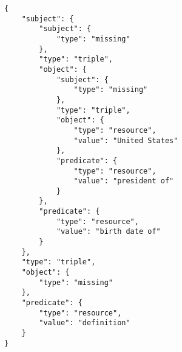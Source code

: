 \begin{verbatim}
{
    "subject": {
        "subject": {
            "type": "missing"
        },
        "type": "triple",
        "object": {
            "subject": {
                "type": "missing"
            },
            "type": "triple",
            "object": {
                "type": "resource",
                "value": "United States"
            },
            "predicate": {
                "type": "resource",
                "value": "president of"
            }
        },
        "predicate": {
            "type": "resource",
            "value": "birth date of"
        }
    },
    "type": "triple",
    "object": {
        "type": "missing"
    },
    "predicate": {
        "type": "resource",
        "value": "definition"
    }
}
\end{verbatim}
